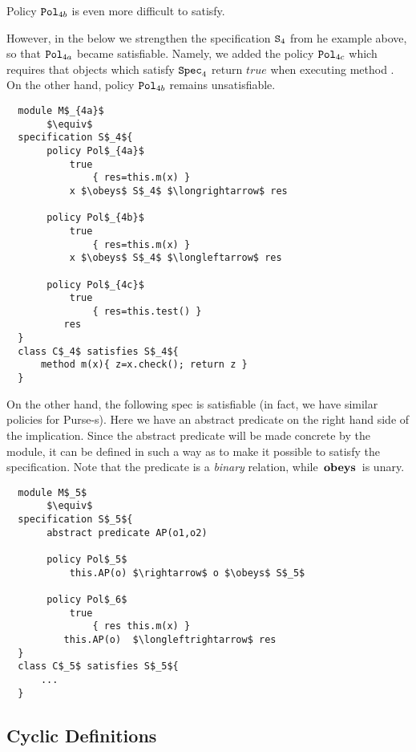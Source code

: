 Policy ${\textrm{\ttfamily{Pol}}}_{4b}$ is even more difficult to satisfy.

\vspace{.1in}

However, in the below we   strengthen the specification  ${\textrm{\ttfamily{S}}}{_4}$ from he example above, so that ${\textrm{\ttfamily{Pol}}}_{4a}$ became satisfiable.
Namely, we added the policy ${\textrm{\ttfamily{Pol}}}_{4c}$ which requires that objects which satisfy  ${\textrm{\ttfamily{Spec}}}_4$ return $true$ when executing method . On the other hand, policy  ${\textrm{\ttfamily{Pol}}}_{4b}$ remains unsatisfiable.


\begin{lstlisting}
  module M$_{4a}$
       $\equiv$
  specification S$_4${
       policy Pol$_{4a}$
           true
               { res=this.m(x) }
           x $\obeys$ S$_4$ $\longrightarrow$ res

       policy Pol$_{4b}$
           true
               { res=this.m(x) }
           x $\obeys$ S$_4$ $\longleftarrow$ res

       policy Pol$_{4c}$
           true
               { res=this.test() }
          res
  }
  class C$_4$ satisfies S$_4${
      method m(x){ z=x.check(); return z }
  }
\end{lstlisting}



\vspace{.1in}
On the other hand, the following spec is satisfiable (in fact, we have similar policies for Purse-s). Here we have an abstract predicate  on the right hand side of the implication. Since the abstract predicate will be made concrete by the module, it can be defined in such a way as to make it possible to satisfy the specification. Note that the predicate  is a  {\em binary} relation, while $\,\textbf{\textrm{obeys}}\,$ is unary.
\begin{lstlisting}
  module M$_5$
       $\equiv$
  specification S$_5${
       abstract predicate AP(o1,o2)

       policy Pol$_5$
           this.AP(o) $\rightarrow$ o $\obeys$ S$_5$

       policy Pol$_6$
           true
               { res this.m(x) }
          this.AP(o)  $\longleftrightarrow$ res
  }
  class C$_5$ satisfies S$_5${
      ...
  }
\end{lstlisting}

\subsection{Cyclic Definitions}


